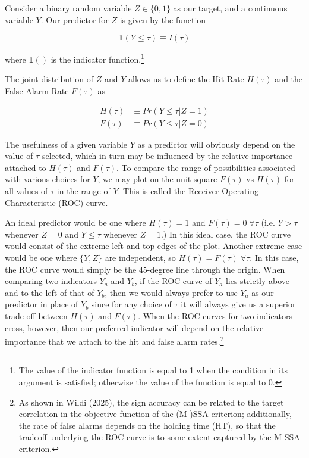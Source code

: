 \documentclass[11pt,a4paper]{article}
\begin{document}
Consider a binary random variable $Z \in \{0,1\}$ as our target, and a continuous variable $Y$. Our predictor for $Z$ is given by the function 

\begin{equation}
    \mathbf{1}(Y \leq \tau) \equiv I(\tau)
\end{equation}

where $\mathbf{1}()$ is the indicator function.\footnote{The value of the indicator function is equal to 1 when the condition in its argument is satisfied; otherwise the value of the function is equal to 0.}

The joint distribution of $Z$ and $Y$ allows us to define the Hit Rate $H(\tau)$ and the False Alarm Rate $F(\tau)$ as 

\begin{align}
    H(\tau) &\equiv Pr( Y \leq \tau | Z = 1)\\
    F(\tau) &\equiv Pr( Y \leq \tau | Z = 0)
\end{align}

The usefulness of a given variable $Y$ as a predictor will obviously depend on the value of $\tau$ selected, which in turn may be influenced by the relative importance attached to $H(\tau)$ and $F(\tau)$. To compare the range of possibilities associated with various choices for $Y$, we may plot on the unit square $F(\tau)$ vs $H(\tau)$ for all values of $\tau$ in the range of $Y$. This is called the Receiver Operating Characteristic (ROC) curve.

An ideal predictor would be one where $H(\tau) = 1$ and $F(\tau) = 0 \; \forall \tau $ (i.e. $Y > \tau$ whenever $Z=0$ and $Y \leq \tau$ whenever $Z=1$.) In this ideal case, the ROC curve would consist of the extreme left and top edges of the plot. Another extreme case would be one where $\{Y,Z\}$ are independent, so $H(\tau) = F(\tau) \; \forall \tau$. In this case, the ROC curve would simply be the 45-degree line through the origin. When comparing two indicators $Y_a$ and $Y_b$, if the ROC curve of $Y_a$ lies strictly above and to the left of that of $Y_b$, then we would always prefer to use $Y_a$ as our predictor in place of $Y_b$ since for any choice of $\tau$ it will always give us a superior trade-off between $H(\tau)$ and $F(\tau)$. When the ROC curves for two indicators cross, however, then our preferred indicator will depend on the relative importance that we attach to the hit and false alarm rates.\footnote{As shown in Wildi (2025), the sign accuracy can be related to the target correlation in the objective function of the (M-)SSA criterion; additionally, the rate of false alarms depends on the holding time (HT), so that the tradeoff underlying the ROC curve is to some extent captured by the M-SSA criterion.} 
\end{document}
